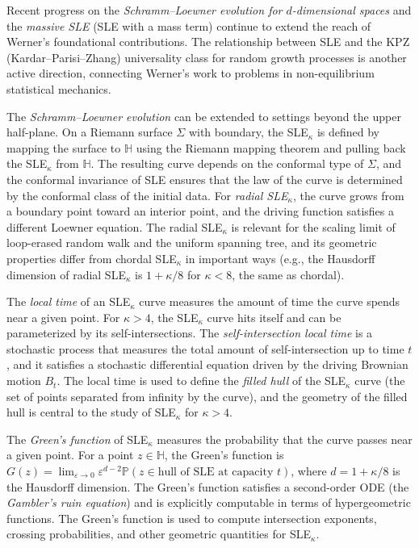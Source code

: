 Recent progress on the \emph{Schramm--Loewner evolution for $d$-dimensional spaces} and the \emph{massive SLE} (SLE with a mass term) continue to extend the reach of Werner's foundational contributions. The relationship between SLE and the KPZ (Kardar--Parisi--Zhang) universality class for random growth processes is another active direction, connecting Werner's work to problems in non-equilibrium statistical mechanics.

The \emph{Schramm--Loewner evolution} can be extended to settings beyond the upper half-plane. On a Riemann surface $\Sigma$ with boundary, the SLE$_\kappa$ is defined by mapping the surface to $\mathbb{H}$ using the Riemann mapping theorem and pulling back the SLE$_\kappa$ from $\mathbb{H}$. The resulting curve depends on the conformal type of $\Sigma$, and the conformal invariance of SLE ensures that the law of the curve is determined by the conformal class of the initial data. For \emph{radial SLE$_\kappa$}, the curve grows from a boundary point toward an interior point, and the driving function satisfies a different Loewner equation. The radial SLE$_\kappa$ is relevant for the scaling limit of loop-erased random walk and the uniform spanning tree, and its geometric properties differ from chordal SLE$_\kappa$ in important ways (e.g., the Hausdorff dimension of radial SLE$_\kappa$ is $1 + \kappa/8$ for $\kappa < 8$, the same as chordal).

The \emph{local time} of an SLE$_\kappa$ curve measures the amount of time the curve spends near a given point. For $\kappa > 4$, the SLE$_\kappa$ curve hits itself and can be parameterized by its self-intersections. The \emph{self-intersection local time} is a stochastic process that measures the total amount of self-intersection up to time $t$, and it satisfies a stochastic differential equation driven by the driving Brownian motion $B_t$. The local time is used to define the \emph{filled hull} of the SLE$_\kappa$ curve (the set of points separated from infinity by the curve), and the geometry of the filled hull is central to the study of SLE$_\kappa$ for $\kappa > 4$.

The \emph{Green's function} of SLE$_\kappa$ measures the probability that the curve passes near a given point. For a point $z \in \mathbb{H}$, the Green's function is $G(z) = \lim_{\varepsilon \to 0} \varepsilon^{d-2} \mathbb{P}(z \in \text{hull of SLE at capacity } t)$, where $d = 1 + \kappa/8$ is the Hausdorff dimension. The Green's function satisfies a second-order ODE (the \emph{Gambler's ruin equation}) and is explicitly computable in terms of hypergeometric functions. The Green's function is used to compute intersection exponents, crossing probabilities, and other geometric quantities for SLE$_\kappa$.

